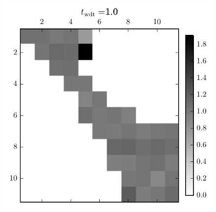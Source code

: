 \begin{figure}[h]
  \centering
    \includegraphics[scale=0.75]{images/results/matshows/homog_sp0_matshow_9}
\end{figure}

